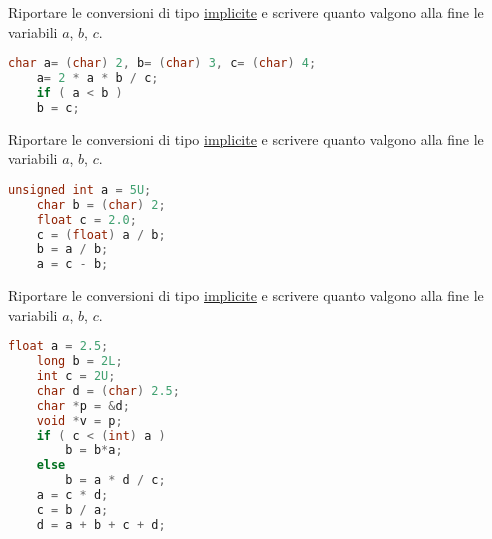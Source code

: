 \documentclass[addpoints,11pt]{exam}
\begin{document}
\boxedpoints
{}
\begin{center}
\end{center}

\vspace{5mm}

\noindent{}



\begin{questions} 

\question[1]
Riportare le conversioni di tipo \underline{implicite} e scrivere quanto valgono alla fine le variabili $a$, $b$, $c$.

\begin{minipage}[t]{0.5\linewidth}
	\begin{lstlisting}[language=C]
	char a= (char) 2, b= (char) 3, c= (char) 4;
	a= 2 * a * b / c;
	if ( a < b ) 
	b = c;\end{lstlisting}
\end{minipage}
\begin{minipage}[t]{0.5\linewidth}
	\makeemptybox{50pt}
\end{minipage}



\question[2]
Riportare le conversioni di tipo \underline{implicite} e scrivere quanto valgono alla fine le variabili $a$, $b$, $c$.

\begin{minipage}[t]{0.5\linewidth}
	\begin{lstlisting}[language=C]
	unsigned int a = 5U;
	char b = (char) 2;
	float c = 2.0;
	c = (float) a / b;
	b = a / b;
	a = c - b;\end{lstlisting}
\end{minipage}
\begin{minipage}[t]{0.5\linewidth}
	\makeemptybox{70pt}
\end{minipage}



\question[3]
Riportare le conversioni di tipo \underline{implicite} e scrivere quanto valgono alla fine le variabili $a$, $b$, $c$.

\begin{minipage}[t]{0.5\linewidth}
	\begin{lstlisting}[language=C]
	float a = 2.5;
	long b = 2L;
	int c = 2U;
	char d = (char) 2.5;
	char *p = &d;
	void *v = p;
	if ( c < (int) a )
	    b = b*a;
	else
	    b = a * d / c;
	a = c * d;
	c = b / a;
	d = a + b + c + d;\end{lstlisting}
\end{minipage}
\begin{minipage}[t]{0.5\linewidth}
	\makeemptybox{145pt}
\end{minipage}




\end{questions}
\end{document}
